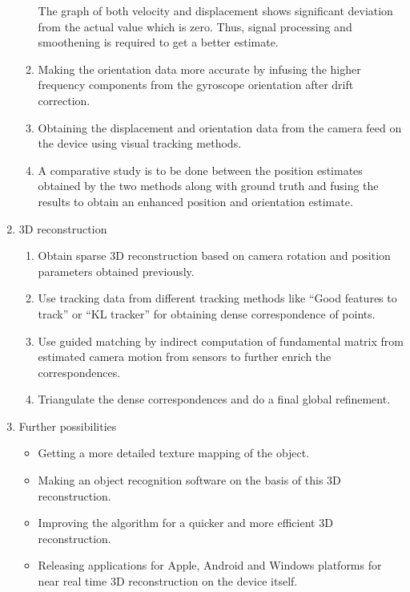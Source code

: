 \documentclass{article}
\begin{document}
\begin{enumerate}
\begin{enumerate}
					The graph of both velocity and displacement shows significant deviation from the actual value which is zero.
					Thus, signal processing and smoothening is required to get a better estimate.

				\item
					Making the orientation data more accurate by infusing the higher frequency components from the gyroscope orientation after drift correction.
				\item
					Obtaining the displacement and orientation data from the camera feed on the device using visual tracking methods.
				\item
					A comparative study is to be done between the position estimates obtained by the two methods along with ground truth and fusing the results to obtain an enhanced position and orientation estimate.
			\end{enumerate}
			\item 3D reconstruction
			\begin{enumerate}
				\item 
					Obtain sparse 3D reconstruction based on camera rotation and position parameters obtained previously.
				\item
					Use tracking data from different tracking methods like ``Good features to track'' or ``KL tracker'' for obtaining dense correspondence of points.
				\item
					Use guided matching by indirect computation of fundamental matrix from estimated camera motion from sensors to further enrich the correspondences.
				\item
					Triangulate the dense correspondences and do a final global refinement.					
			\end{enumerate}
			\item Further possibilities
			\begin{itemize}
			    \item Getting a more detailed texture mapping of the object.
			    \item Making an object recognition software on the basis of this 3D reconstruction.
			    \item Improving the algorithm for a quicker and more efficient 3D reconstruction. 
				\item Releasing applications for Apple, Android and Windows platforms for near real time 3D reconstruction on the device itself.
			\end{itemize}
		\end{enumerate}
\end{document}
